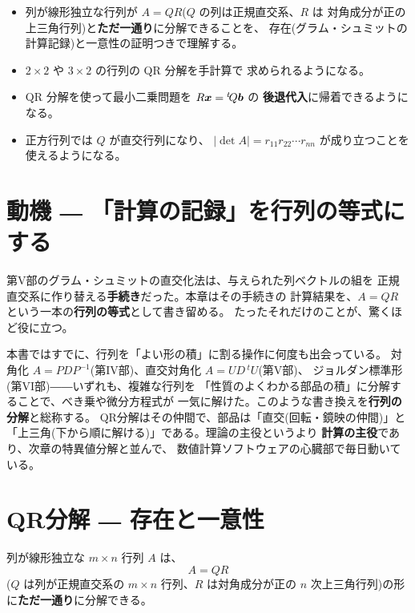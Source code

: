 \begin{goal}
\begin{itemize}
\item 列が線形独立な行列が $A = QR$($Q$ の列は正規直交系、$R$ は
対角成分が正の上三角行列)と\textbf{ただ一通り}に分解できることを、
存在(グラム・シュミットの計算記録)と一意性の証明つきで理解する。
\item $2 \times 2$ や $3 \times 2$ の行列の QR 分解を手計算で
求められるようになる。
\item QR 分解を使って最小二乗問題を $R\bm{x} = {}^t\!Q\bm{b}$ の
\textbf{後退代入}に帰着できるようになる。
\item 正方行列では $Q$ が直交行列になり、
$|\det A| = r_{11}r_{22}\cdots r_{nn}$ が成り立つことを使えるようになる。
\end{itemize}
\end{goal}

\section{動機 ― 「計算の記録」を行列の等式にする}

第V部のグラム・シュミットの直交化法は、与えられた列ベクトルの組を
正規直交系に作り替える\textbf{手続き}だった。本章はその手続きの
計算結果を、$A = QR$ という一本の\textbf{行列の等式}として書き留める。
たったそれだけのことが、驚くほど役に立つ。

本書ではすでに、行列を「よい形の積」に割る操作に何度も出会っている。
対角化 $A = PDP^{-1}$(第IV部)、直交対角化 $A = U D\,{}^t U$(第V部)、
ジョルダン標準形(第VI部)――いずれも、複雑な行列を
「性質のよくわかる部品の積」に分解することで、べき乗や微分方程式が
一気に解けた。このような書き換えを\textbf{行列の分解}と総称する。
QR分解はその仲間で、部品は「直交(回転・鏡映の仲間)」と
「上三角(下から順に解ける)」である。理論の主役というより
\textbf{計算の主役}であり、次章の特異値分解と並んで、
数値計算ソフトウェアの心臓部で毎日動いている。

\section{QR分解 ― 存在と一意性}

\begin{teiri}[QR分解]\label{thm:qr-main}
列が線形独立な $m \times n$ 行列 $A$ は、
\[
A = QR
\]
($Q$ は列が正規直交系の $m \times n$ 行列、$R$ は対角成分が正の
$n$ 次上三角行列)の形に\textbf{ただ一通り}に分解できる。
\end{teiri}

